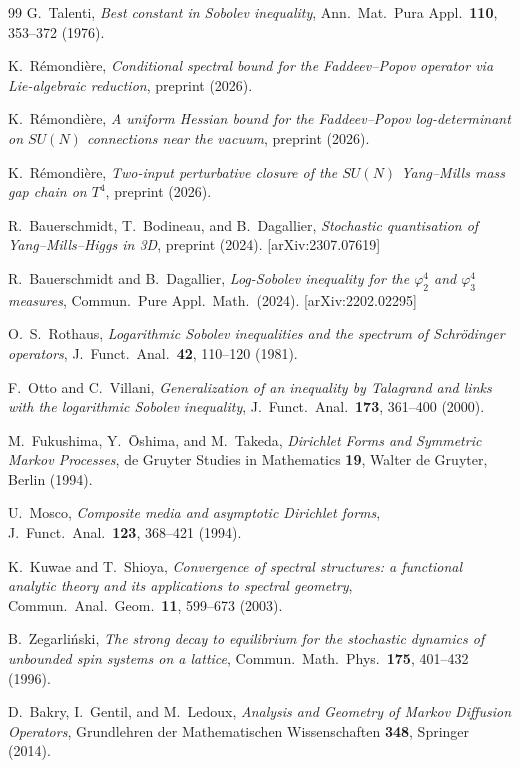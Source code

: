 \documentclass[11pt,a4paper]{amsart}
\theoremstyle{definition}
\theoremstyle{remark}
\begin{document}
\begin{thebibliography}{99}
G.~Talenti,
\emph{Best constant in Sobolev inequality},
Ann.\ Mat.\ Pura Appl.\ \textbf{110}, 353--372 (1976).

K.~R\'emondi\`ere,
\emph{Conditional spectral bound for the Faddeev--Popov operator via Lie-algebraic reduction},
preprint (2026).

K.~R\'emondi\`ere,
\emph{A uniform Hessian bound for the Faddeev--Popov log-determinant on $SU(N)$ connections near the vacuum},
preprint (2026).

K.~R\'emondi\`ere,
\emph{Two-input perturbative closure of the $SU(N)$ Yang--Mills mass gap chain on $T^4$},
preprint (2026).

R.~Bauerschmidt, T.~Bodineau, and B.~Dagallier,
\emph{Stochastic quantisation of Yang--Mills--Higgs in 3D},
preprint (2024).
[arXiv:2307.07619]

R.~Bauerschmidt and B.~Dagallier,
\emph{Log-Sobolev inequality for the $\varphi^4_2$ and $\varphi^4_3$ measures},
Commun.\ Pure Appl.\ Math.\ (2024).
[arXiv:2202.02295]

O.~S.~Rothaus,
\emph{Logarithmic Sobolev inequalities and the spectrum of Schr\"odinger operators},
J.\ Funct.\ Anal.\ \textbf{42}, 110--120 (1981).

F.~Otto and C.~Villani,
\emph{Generalization of an inequality by Talagrand and links with the logarithmic Sobolev inequality},
J.\ Funct.\ Anal.\ \textbf{173}, 361--400 (2000).

M.~Fukushima, Y.~\=Oshima, and M.~Takeda,
\emph{Dirichlet Forms and Symmetric Markov Processes},
de Gruyter Studies in Mathematics \textbf{19}, Walter de Gruyter, Berlin (1994).

U.~Mosco,
\emph{Composite media and asymptotic Dirichlet forms},
J.\ Funct.\ Anal.\ \textbf{123}, 368--421 (1994).

K.~Kuwae and T.~Shioya,
\emph{Convergence of spectral structures: a functional analytic theory and its applications to spectral geometry},
Commun.\ Anal.\ Geom.\ \textbf{11}, 599--673 (2003).

B.~Zegarli\'nski,
\emph{The strong decay to equilibrium for the stochastic dynamics of unbounded spin systems on a lattice},
Commun.\ Math.\ Phys.\ \textbf{175}, 401--432 (1996).

D.~Bakry, I.~Gentil, and M.~Ledoux,
\emph{Analysis and Geometry of Markov Diffusion Operators},
Grundlehren der Mathematischen Wissenschaften \textbf{348},
Springer (2014).


\end{thebibliography}
\end{document}
